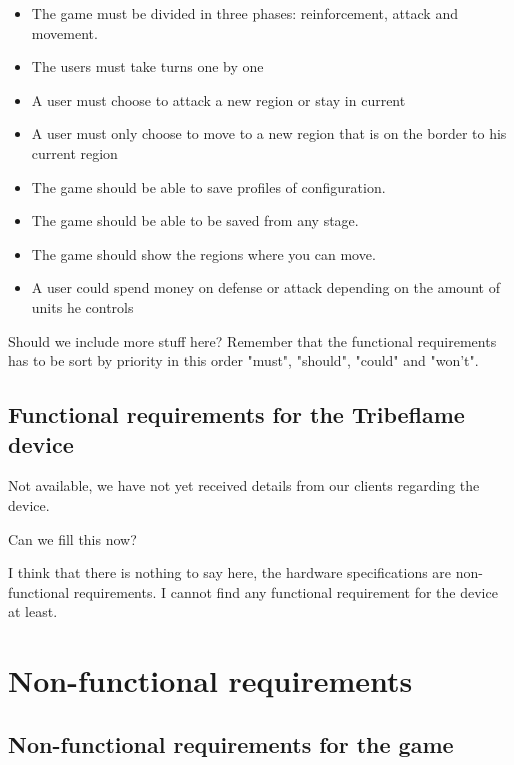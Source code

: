 \documentclass[12pt,a4paper]{article}
\begin{document}
\begin{itemize}
\item The game must be divided in three phases: reinforcement, attack
  and movement.
\item The users must take turns one by one
\item A user must choose to attack a new region or stay in current
\item A user must only choose to move to a new region that is on the
  border to his current region
\item The game should be able to save profiles of configuration.
\item The game should be able to be saved from any stage.
\item The game should show the regions where you can move.
\item A user could spend money on defense or attack depending on the
  amount of units he controls
\end{itemize}

\begin{todo}[Alberto]
  Should we include more stuff here? Remember that the functional
  requirements has to be sort by priority in this order "must", "should",
  "could" and "won't".
\end{todo}

\subsection{Functional requirements for the Tribeflame device}

Not available, we have not yet received details from our clients
regarding the device.

\begin{todo}
  Can we fill this now?
\end{todo}

\begin{todo}[Alberto]
  I think that there is nothing to say here, the hardware specifications
  are non-functional requirements. I cannot find any functional 
  requirement for the device at least.
\end{todo}

\section{Non-functional requirements}

\subsection{Non-functional requirements for the game}
\end{document}
